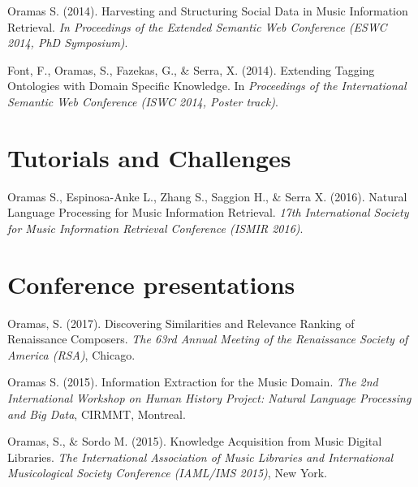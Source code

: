 Oramas S. (2014). Harvesting and Structuring Social Data in Music Information Retrieval. \emph{In Proceedings of the Extended Semantic Web Conference (ESWC 2014, PhD Symposium)}.

\vspace{0.2cm}

Font, F., Oramas, S., Fazekas, G., \& Serra, X. (2014). Extending Tagging Ontologies with Domain Specific Knowledge. In \emph{Proceedings of the International Semantic Web Conference (ISWC 2014, Poster track)}.


\section*{Tutorials and Challenges}

Oramas S., Espinosa-Anke L., Zhang S., Saggion H., \& Serra X. (2016). Natural Language Processing for Music Information Retrieval. \emph{17th International Society for Music Information Retrieval Conference (ISMIR 2016)}.


\section*{Conference presentations}

Oramas, S. (2017). Discovering Similarities and Relevance Ranking of Renaissance Composers. \emph{The 63rd Annual Meeting of the Renaissance Society of America (RSA)}, Chicago.

\vspace{0.2cm}

Oramas S. (2015). Information Extraction for the Music Domain. \emph{The 2nd International Workshop on Human History Project: Natural Language Processing and Big Data}, CIRMMT, Montreal.

\vspace{0.2cm}

Oramas, S., \& Sordo M. (2015). Knowledge Acquisition from Music Digital Libraries. \emph{The International Association of Music Libraries and International Musicological Society Conference (IAML/IMS 2015)}, New York.

